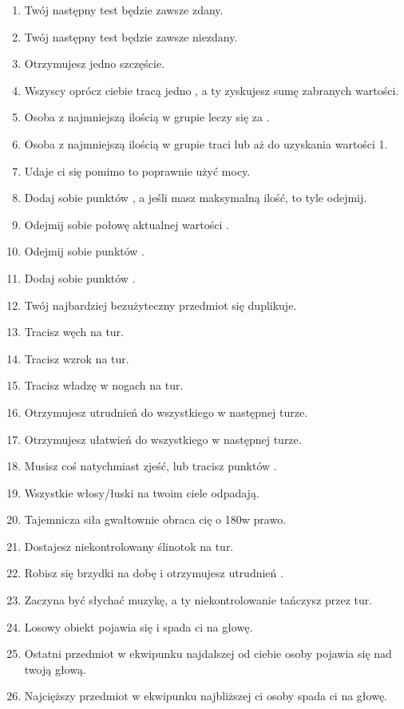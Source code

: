 \begin{enumerate}
	\item Twój następny test \abt{} będzie zawsze zdany.
	\item Twój następny test \abt{} będzie zawsze niezdany.
	\item Otrzymujesz jedno szczęście.
	\item Wszyscy oprócz ciebie tracą jedno \abzyc{}, a ty zyskujesz sumę zabranych wartości.
	\item Osoba z najmniejszą ilością \abzyc{} w grupie leczy się za \dvi{}.
	\item Osoba z najmniejszą ilością \abzyc{} w grupie traci \dvi{} lub aż do uzyskania wartości 1.
	\item Udaje ci się pomimo to poprawnie użyć mocy.
	\item Dodaj sobie \dvi{} punktów \abzyc{}, a jeśli masz maksymalną ilość, to tyle odejmij.
	\item Odejmij sobie połowę aktualnej wartości \abzyc{}.
	\item Odejmij sobie \diiii{} punktów \abzyc{}.
	\item Dodaj sobie \diiii{} punktów \abzyc{}.
	\item Twój najbardziej bezużyteczny przedmiot się duplikuje.
	\item Tracisz węch na \dvi{} tur.
	\item Tracisz wzrok na \dvi{} tur.
	\item Tracisz władzę w nogach na \dvi{} tur.
	\item Otrzymujesz \diiii{} utrudnień do wszystkiego w następnej turze.
	\item Otrzymujesz \diiii{} ułatwień do wszystkiego w następnej turze.
	\item Musisz coś natychmiast zjeść, lub tracisz \diiii{} punktów \abzyc{}.
	\item Wszystkie włosy/łuski na twoim ciele odpadają.
	\item Tajemnicza siła gwałtownie obraca cię o 180\textdegree w prawo.
	\item Dostajesz niekontrolowany ślinotok na \dxx{} tur.
	\item Robisz się brzydki na dobę i otrzymujesz \diiii{} utrudnień \abt{}.
	\item Zaczyna być słychać muzykę, a ty niekontrolowanie tańczysz przez \dvi{} tur.
	\item Losowy obiekt pojawia się i spada ci na głowę.
	\item Ostatni przedmiot w ekwipunku najdalszej od ciebie osoby pojawia się nad twoją głową.
	\item Najcięższy przedmiot w ekwipunku najbliższej ci osoby spada ci na głowę.

\end{enumerate}
